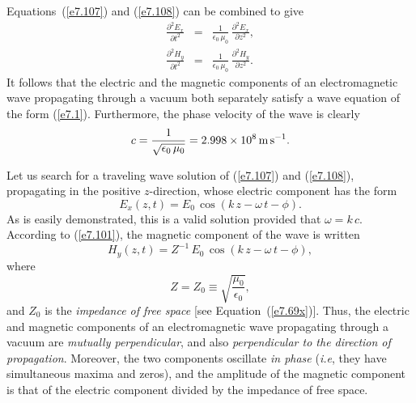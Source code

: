 Equations~(\ref{e7.107}) and (\ref{e7.108}) can be combined to give
\begin{eqnarray}
\frac{\partial^2 E_x}{\partial t^2}&=&\frac{1}{\epsilon_0\,\mu_0}\,\frac{\partial^2 E_x}{\partial z^2},\label{e7.103}\\[0.5ex]
\frac{\partial^2 H_y}{\partial t^2}&=&\frac{1}{\epsilon_0\,\mu_0}\,\frac{\partial^2 H_y}{\partial z^2}.
\end{eqnarray}
It follows that  the electric and the magnetic components of an electromagnetic wave 
propagating through a vacuum both separately satisfy
a wave equation of the form (\ref{e7.1}). Furthermore,  the phase velocity of the
wave  is clearly
\begin{equation}\label{e7.111}
c = \frac{1}{\sqrt{\epsilon_0\,\mu_0}}=2.998\times 10^8\,{\rm m\,s}^{-1}.
\end{equation}

Let us search for a traveling wave solution of (\ref{e7.107}) and (\ref{e7.108}), propagating in the
positive $z$-direction, whose electric component has the form
\begin{equation}\label{e7.112}
E_x(z,t)=E_0\,\cos(k\,z-\omega\,t-\phi).
\end{equation}
As is easily demonstrated, this is a valid solution provided that $\omega=k\,c$. According to 
(\ref{e7.101}), the magnetic component of the wave is written
\begin{equation}\label{e7.113}
H_y(z,t)=Z^{-1}\,E_0\,\cos(k\,z-\omega\,t-\phi),
\end{equation}
where
\begin{equation}
Z= Z_0 \equiv \sqrt{\frac{\mu_0}{\epsilon_0}},
\end{equation}
and $Z_0$ is the {\em impedance of free space}\/ [see Equation~(\ref{e7.69x})].
Thus, the electric and magnetic components of an electromagnetic wave propagating through a vacuum are {\em mutually perpendicular},
and also {\em perpendicular to the direction of propagation}. Moreover, the two components
oscillate {\em in phase}\/ ({\em i.e}, they have simultaneous maxima and zeros), and
the amplitude of the magnetic component is that of the electric component
divided by the impedance of free space. 

